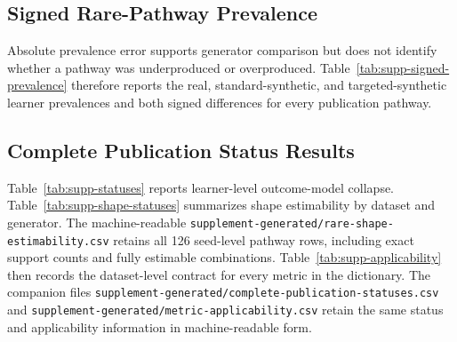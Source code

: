 \documentclass[10pt]{article}
\begin{document}






\begin{landscape}
\section{Signed Rare-Pathway Prevalence}
\label{sec:signed-prevalence}

Absolute prevalence error supports generator comparison but does not identify
whether a pathway was underproduced or overproduced.  Table~\ref{tab:supp-signed-prevalence}
therefore reports the real, standard-synthetic, and targeted-synthetic learner
prevalences and both signed differences for every publication pathway.


\end{landscape}

\begin{landscape}
\section{Complete Publication Status Results}
\label{sec:statuses}

Table~\ref{tab:supp-statuses} reports learner-level outcome-model collapse.
Table~\ref{tab:supp-shape-statuses} summarizes shape estimability by
dataset and generator. The machine-readable
\texttt{supplement-generated/rare-shape-estimability.csv} retains all 126
seed-level pathway rows,
including exact support counts and fully estimable combinations.
Table~\ref{tab:supp-applicability} then records the dataset-level contract for
every metric in the dictionary. The companion files
\texttt{supplement-generated/complete-publication-statuses.csv} and
\texttt{supplement-generated/metric-applicability.csv} retain the same status and applicability
information in machine-readable form.




\end{landscape}

\clearpage
\end{document}
